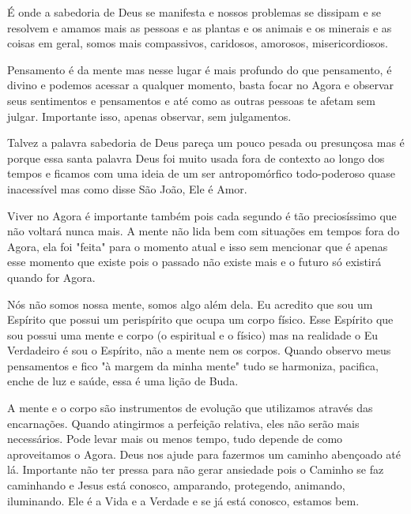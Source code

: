 \emdash{}É onde a sabedoria de Deus se manifesta e nossos problemas se dissipam e se resolvem e amamos mais as pessoas e as plantas e os animais e os minerais e as coisas em geral, somos mais compassivos, caridosos, amorosos, misericordiosos. 

\emdash{}Pensamento é da mente mas nesse lugar é mais profundo do que pensamento, é divino e podemos acessar a qualquer momento, basta focar no Agora e observar seus sentimentos e pensamentos e até como as outras pessoas te afetam sem julgar. Importante isso, apenas observar, sem julgamentos. 

\emdash{}Talvez a palavra sabedoria de Deus pareça um pouco pesada ou presunçosa mas é porque essa santa palavra Deus foi muito usada fora de contexto ao longo dos tempos e ficamos com uma ideia de um ser antropomórfico todo-poderoso quase inacessível mas como disse São João, Ele é Amor. 

\emdash{}Viver no Agora é importante também pois cada segundo é tão preciosíssimo que não voltará nunca mais. A mente não lida bem com situações em tempos fora do Agora, ela foi "feita" para o momento atual e isso sem mencionar que é apenas esse momento que existe pois o passado não existe mais e o futuro só existirá quando for Agora. 

\emdash{}Nós não somos nossa mente, somos algo além dela. Eu acredito que sou um Espírito que possui um perispírito que ocupa um corpo físico. Esse Espírito que sou possui uma mente e corpo (o espiritual e o físico) mas na realidade o Eu Verdadeiro é sou o Espírito, não a mente nem os corpos. Quando observo meus pensamentos e fico "à margem da minha mente" tudo se harmoniza, pacifica, enche de luz e saúde, essa é uma lição de Buda. 

\emdash{}A mente e o corpo são instrumentos de evolução que utilizamos através das encarnações. Quando atingirmos a perfeição relativa, eles não serão mais necessários. Pode levar mais ou menos tempo, tudo depende de como aproveitamos o Agora. Deus nos ajude para fazermos um caminho abençoado até lá. Importante não ter pressa para não gerar ansiedade pois o Caminho se faz caminhando e Jesus está conosco, amparando, protegendo, animando, iluminando. Ele é a Vida e a Verdade e se já está conosco, estamos bem. 

